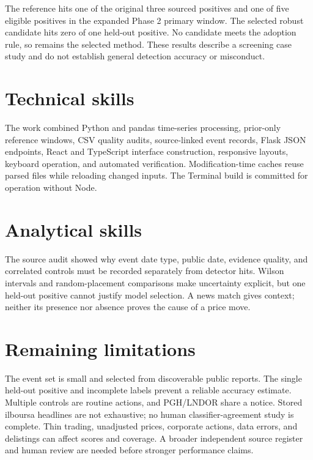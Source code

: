 The reference hits one of the original three sourced positives and one
of five eligible positives in the expanded Phase 2 primary window.
The selected robust candidate hits zero of one held-out positive.
No candidate meets the adoption rule, so  remains
the selected method. These results describe a screening case study and
do not establish general detection accuracy or misconduct.

\section{Technical skills}
The work combined Python and pandas time-series processing, prior-only
reference windows, CSV quality audits, source-linked event records,
Flask JSON endpoints, React and TypeScript interface construction,
responsive layouts, keyboard operation, and automated verification.
Modification-time caches reuse parsed files while reloading changed
inputs. The Terminal build is committed for operation without Node.

\section{Analytical skills}
The source audit showed why event date type, public date, evidence
quality, and correlated controls must be recorded separately from
detector hits. Wilson intervals and random-placement comparisons make
uncertainty explicit, but one held-out positive cannot justify model
selection. A news match gives context; neither its presence nor absence
proves the cause of a price move.

\section{Remaining limitations}
The event set is small and selected from discoverable public reports.
The single held-out positive and incomplete labels prevent a reliable
accuracy estimate. Multiple controls are routine actions, and PGH/LNDOR
share a notice. Stored ilboursa headlines are not exhaustive; no
human classifier-agreement study is complete. Thin trading, unadjusted
prices, corporate actions, data errors, and delistings can affect
scores and coverage. A broader independent source register and human
review are needed before stronger performance claims.
